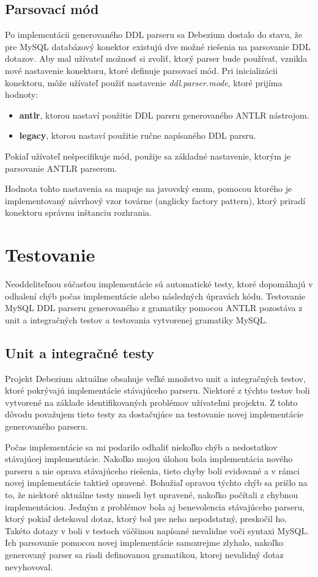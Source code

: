 \subsection{Parsovací mód}
Po implementácii generovaného DDL parseru sa Debezium dostalo do stavu, že pre MySQL databázový konektor existujú dve možné riešenia na parsovanie DDL dotazov. Aby mal užívateľ možnosť si zvoliť, ktorý parser bude používať, vznikla nové nastavenie konektoru, ktoré definuje parsovací mód. Pri inicializácii konektoru, môže užívateľ použiť nastavenie \textit{ddl.parser.mode}, ktoré prijíma hodnoty:

\begin{itemize}
\item \textbf{antlr}, ktorou nastaví použitie DDL parsru generovaného ANTLR nástrojom.
\item \textbf{legacy}, ktorou nastaví použitie ručne napísaného DDL parsru.
\end{itemize}

Pokiaľ užívateľ nešpecifikuje mód, použije sa základné nastavenie, ktorým je parsovanie ANTLR parserom.

Hodnota tohto nastavenia sa mapuje na javovský enum, pomocou ktorého je implementovaný návrhový vzor továrne (anglicky factory pattern), ktorý priradí konektoru správnu inštanciu  rozhrania.

\section{Testovanie}
Neoddeliteľnou súčasťou implementácie sú automatické testy, ktoré dopomáhajú v odhalení chýb počas implementácie alebo následných úpravách kódu. Testovanie MySQL DDL parseru generovaného z gramatiky pomocou ANTLR pozostáva z unit a integračných testov a testovania vytvorenej gramatiky MySQL.

\subsection{Unit a integračné testy}
Projekt Debezium aktuálne obsahuje veľké množstvo unit a integračných testov, ktoré pokrývajú implementácie stávajúceho parseru. Niektoré z týchto testov boli vytvorené na základe identifikovaných problémov užívateľmi projektu. Z tohto dôvodu považujem tieto testy za dostačujúce na testovanie novej implementácie generovaného parseru. 

Počas implementácie sa mi podarilo odhaliť niekoľko chýb a nedostatkov stávajúcej implementácie. Nakoľko mojou úlohou bola implementácia nového parseru a nie oprava stávajúceho riešenia, tieto chyby boli evidované a v rámci novej implementácie taktiež opravené. Bohužiaľ opravou týchto chýb sa prišlo na to, že niektoré aktuálne testy museli byt upravené, nakoľko počítali z chybnou implementáciou. Jedným z problémov bola aj benevolencia stávajúceho parseru, ktorý pokiaľ detekoval dotaz, ktorý bol pre neho nepodstatný, preskočil ho. Takéto dotazy v boli v testoch väčšinou napísané nevalidne voči syntaxi MySQL. Ich parsovanie pomocou novej implementácie samozrejme zlyhalo, nakoľko generovaný parser sa riadi definovanou gramatikou, ktorej nevalidný dotaz nevyhovoval.

